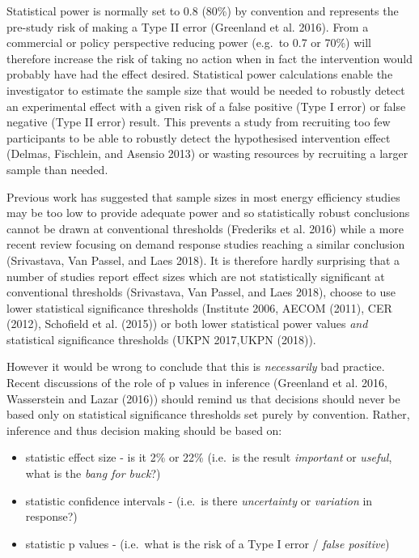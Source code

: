 \documentclass[]{article}
\providecommand{\tightlist}{%
  \setlength{\itemsep}{0pt}\setlength{\parskip}{0pt}}
\theoremstyle{definition}
\theoremstyle{definition}
\theoremstyle{definition}
\theoremstyle{remark}
\begin{document}
Statistical power is normally set to 0.8 (80\%) by convention and
represents the pre-study risk of making a Type II error (Greenland et
al. 2016). From a commercial or policy perspective reducing power
(e.g.~to 0.7 or 70\%) will therefore increase the risk of taking no
action when in fact the intervention would probably have had the effect
desired. Statistical power calculations enable the investigator to
estimate the sample size that would be needed to robustly detect an
experimental effect with a given risk of a false positive (Type I error)
or false negative (Type II error) result. This prevents a study from
recruiting too few participants to be able to robustly detect the
hypothesised intervention effect (Delmas, Fischlein, and Asensio 2013)
or wasting resources by recruiting a larger sample than needed.

Previous work has suggested that sample sizes in most energy efficiency
studies may be too low to provide adequate power and so statistically
robust conclusions cannot be drawn at conventional thresholds (Frederiks
et al. 2016) while a more recent review focusing on demand response
studies reaching a similar conclusion (Srivastava, Van Passel, and Laes
2018). It is therefore hardly surprising that a number of studies report
effect sizes which are not statistically significant at conventional
thresholds (Srivastava, Van Passel, and Laes 2018), choose to use lower
statistical significance thresholds (Institute 2006, AECOM (2011), CER
(2012), Schofield et al. (2015)) or both lower statistical power values
\emph{and} statistical significance thresholds (UKPN 2017,UKPN (2018)).

However it would be wrong to conclude that this is \emph{necessarily}
bad practice. Recent discussions of the role of p values in inference
(Greenland et al. 2016, Wasserstein and Lazar (2016)) should remind us
that decisions should never be based only on statistical significance
thresholds set purely by convention. Rather, inference and thus decision
making should be based on:

\begin{itemize}
\tightlist
\item
  statistic effect size - is it 2\% or 22\% (i.e.~is the result
  \emph{important} or \emph{useful}, what is the \emph{bang for buck}?)
\item
  statistic confidence intervals - (i.e.~is there \emph{uncertainty} or
  \emph{variation} in response?)
\item
  statistic p values - (i.e.~what is the risk of a Type I error /
  \emph{false positive})
\end{itemize}
\end{document}
